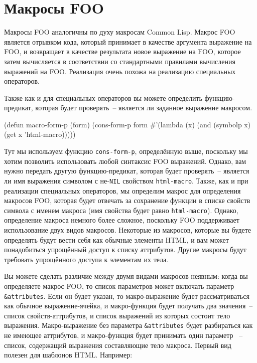 \section{Макросы FOO}

Макросы FOO аналогичны по духу макросам Common Lisp.  Макрос FOO является отрывком кода,
который принимает в качестве аргумента выражение на FOO, и возвращает в качестве
результата новое выражение на FOO, которое затем вычисляется в соответствии со
стандартными правилами вычисления выражений на FOO.  Реализация очень похожа на реализацию
специальных операторов.

Также как и для специальных операторов вы можете определить функцию-предикат, которая
будет проверять~-- является ли заданное выражение макросом.

\begin{myverb}
(defun macro-form-p (form)
  (cons-form-p form #'(lambda (x) (and (symbolp x) (get x 'html-macro)))))
\end{myverb}

Тут мы используем функцию \lstinline{cons-form-p}, определённую выше, поскольку мы хотим
позволить использовать любой синтаксис FOO выражений.  Однако, вам нужно передать другую
функцию-предикат, которая будет проверять~-- является ли имя выражения символом с
не-\lstinline{NIL} свойством \lstinline{html-macro}.  Также, как и при реализации специальных
операторов, мы определим макрос для определения макросов FOO, которая будет отвечать за
сохранение функции в списке свойств символа с именем макроса (имя свойства будет равно
\lstinline{html-macro}).  Однако, определение макроса немного более сложное, поскольку FOO
поддерживает использование двух видов макросов. Некоторые из макросов, которые вы будете
определять будут вести себя как обычные элементы HTML, и вам может понадобиться упрощённый
доступ к списку аттрибутов.  Другие макросы будут требовать упрощённого доступа к
элементам их тела.

Вы можете сделать различие между двумя видами макросов неявным: когда вы определяете
макрос FOO, то список параметров может включать параметр \lstinline!&attributes!.  Если он
будет указан, то макро-выражение будет рассматриваться как обычное выражение-ячейка, и
макро-функция будет получать два значения~-- список свойств-аттрибутов, и список выражений
из которых состоит тело выражения.  Макро-выражение без параметра \lstinline!&attributes!
будет разбираться как не имеющее аттрибутов, и макро-функция будет принимать один параметр
~-- список, содержащий выражения составляющие тело макроса.  Первый вид полезен для
шаблонов HTML. Например:


